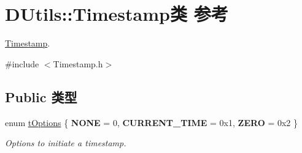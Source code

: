 \hypertarget{classDUtils_1_1Timestamp}{\section{D\-Utils\-:\-:Timestamp类 参考}
\label{classDUtils_1_1Timestamp}
}


\hyperlink{classDUtils_1_1Timestamp}{Timestamp}.  




{\ttfamily \#include $<$Timestamp.\-h$>$}

\subsection*{Public 类型}
\begin{DoxyCompactItemize}
\item 
enum \hyperlink{classDUtils_1_1Timestamp_a5a8a3cb7f9e0f73bf11fce42688b06c8}{t\-Options} \{ {\bfseries N\-O\-N\-E} = 0, 
{\bfseries C\-U\-R\-R\-E\-N\-T\-\_\-\-T\-I\-M\-E} = 0x1, 
{\bfseries Z\-E\-R\-O} = 0x2
 \}
\begin{DoxyCompactList}\small\item\em Options to initiate a timestamp. \end{DoxyCompactList}\end{DoxyCompactItemize}
